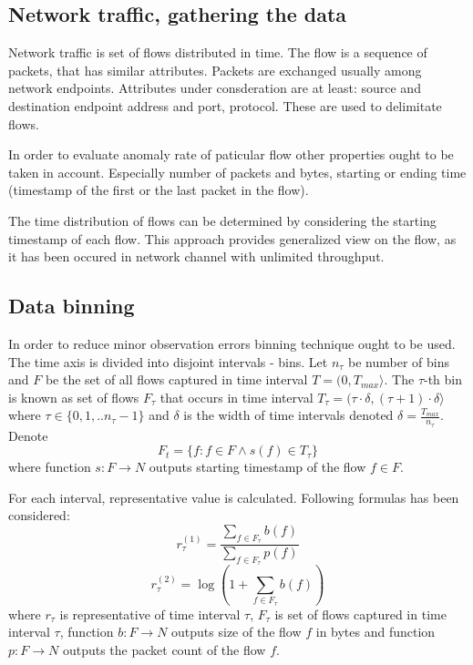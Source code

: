 \documentclass[a4paper]{IEEEtran}
\begin{document}
\subsection{Network traffic, gathering the data}
Network traffic is set of flows distributed in time.
The flow is a sequence of packets, that has similar attributes. Packets
are exchanged usually among network endpoints. Attributes
under consderation are at least: source and destination endpoint address and port,
protocol. These are used to delimitate flows.

In order to evaluate anomaly rate of paticular flow other properties ought to be
taken in account. Especially number of packets and bytes, starting or ending time
(timestamp of the first or the last packet in the flow).

The time distribution of flows can be determined by considering the
starting timestamp of each flow. This approach provides generalized view on the flow, 
as it has been occured in network channel with unlimited throughput.

\subsection{Data binning}
In order to reduce minor observation errors binning technique ought to be used.
The time axis is divided into disjoint intervals - bins.
Let $n_\tau$ be number of bins and $F$ be the set of all flows captured in time interval
$T = (0, T_{max}\rangle $. The $\tau$-th bin is known as set of flows $F_\tau$ 
that occurs in time interval
$T_\tau = (\tau\cdot \delta, (\tau+1)\cdot \delta\rangle $ where 
$\tau \in \{0, 1, .. n_\tau-1\}$ and $\delta$ is the width of time intervals
denoted $\delta = \frac{T_{max}}{n_\tau}$.
Denote
\[
F_t = \{f : f \in F \wedge s(f) \in T_\tau \}
\]
where function $s:F \rightarrow N $ outputs starting timestamp of the flow $f\in F$.

For each interval,
representative value is calculated. Following formulas has been considered:
\[
r_\tau^{(1)} = \frac{\sum\limits_{f\in F_\tau}b(f)}{\sum\limits_{f\in F_\tau}p(f)}
\]
\[
r_\tau^{(2)} = \log(1+\sum\limits_{f\in F_\tau}b(f))
\]
where $r_\tau$ is representative of time interval $\tau$, $F_\tau$ is set of flows captured in time 
interval $\tau$, function $b:F \rightarrow N$ outputs size of the flow $f$ in bytes and function 
$p:F \rightarrow N$ outputs the packet count of the flow $f$.

\end{document}
